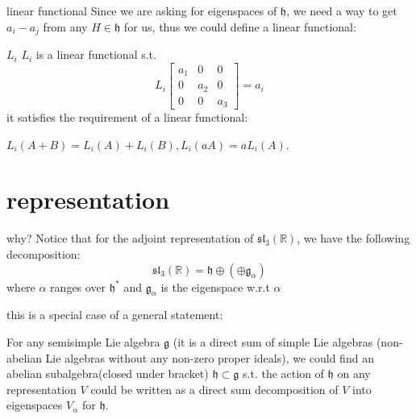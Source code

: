 \documentclass{beamer}
\newcommand{\R}{\mathbb{R}}
\begin{document}
\begin{frame}{linear functional}	
Since we are asking for  eigenspaces of $\mathfrak{h}$, we need a way to get  $a_i-a_j$ from any  $H \in \mathfrak{h}$ for us, thus we could define a linear functional:

\begin{defi}{$L_i$}{}
$L_i$ is a linear functional s.t. \[
		L_i \begin{bmatrix} a_1 & 0 &0 \\ 0 & a_2 & 0 \\ 0 &0 &a_3 \end{bmatrix} = a_i 
	\] it satisfies the requirement of a linear functional: 

	$L_i(A+B) = L_i(A) + L_i(B), L_i(aA) = aL_i(A)$.
\end{defi}
\end{frame}



\section{representation}

\begin{frame}{why?}
Notice that for the adjoint representation of $\mathfrak{sl}_3(\R)$, we have the following decomposition:  \[
		\mathfrak{sl}_3(\R) = \mathfrak{h} \oplus \left( \oplus \mathfrak{g}_\alpha \right) 
	\] where $\alpha$ ranges over $\mathfrak{h}^*$ and $\mathfrak{g}_{\alpha}$ is the eigenspace w.r.t $\alpha$

this is a special case of a general statement:
\begin{theo}{}{}
For any semisimple Lie algebra $\mathfrak{g}$ (it is a direct sum of simple Lie algebras (non-abelian Lie algebras without any non-zero proper ideals), we could find an abelian subalgebra(closed under bracket)  $\mathfrak{h} \subset \mathfrak{g}$ s.t. the action of $\mathfrak{h}$ on any representation $V$ could be written as a direct sum decomposition of $V$ into eigenspaces  $V_{\alpha}$ for $\mathfrak{h}$.
\end{theo}
\end{frame}
\end{document}
